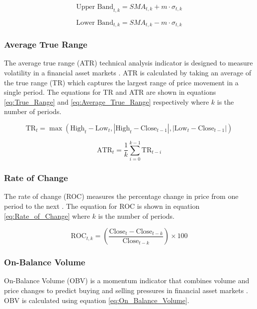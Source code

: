 \documentclass[journal]{new-aiaa}
\begin{document}
\begin{equation}\label{eq:Upper_Band}
        \text{Upper Band}_{t,k} = SMA_{t,k} + m \cdot \sigma_{t,k}
\end{equation}

\begin{equation}\label{eq:Lower_Band}
        \text{Lower Band}_{t,k} = SMA_{t,k} - m \cdot \sigma_{t,k}
\end{equation}

\subsubsection{Average True Range}\label{sec:Technical_Analysis:Average_True_Range}
The average true range (ATR) technical analysis indicator is designed to measure volatility in a financial asset markets \cite{wilder1978new}.
ATR is calculated by taking an average of the true range (TR) which captures the largest range of price movement in a single period.
The equations for TR and ATR are shown in equations \ref{eq:True_Range} and \ref{eq:Average_True_Range} respectively where $k$ is the number of periods.

\begin{equation}\label{eq:True_Range}
        \text{TR}_t = \max\left(\text{High}_t - \text{Low}_t, \left|\text{High}_t - \text{Close}_{t-1}\right|, \left|\text{Low}_t - \text{Close}_{t-1}\right|\right)
\end{equation}

\begin{equation}\label{eq:Average_True_Range}
        \text{ATR}_t = \frac{1}{k} \sum_{i=0}^{k-1} \text{TR}_{t-i}
\end{equation}

\subsubsection{Rate of Change}\label{sec:Technical_Analysis:Rate_of_Change}
The rate of change (ROC) measures the percentage change in price from one period to the next \cite{granville1963new}.
The equation for ROC is shown in equation \ref{eq:Rate_of_Change} where $k$ is the number of periods.

\begin{equation}\label{eq:Rate_of_Change}
        \text{ROC}_{t,k} = \left(\frac{\text{Close}_{t} - \text{Close}_{t-k}}{\text{Close}_{t-k}}\right) \times 100
\end{equation}

\subsubsection{On-Balance Volume}\label{sec:Technical_Analysis:On_Balance_Volume}
On-Balance Volume (OBV) is a momentum indicator that combines volume and price changes to predict buying and selling pressures in financial asset markets \cite{granville1963new}.
OBV is calculated using equation \ref{eq:On_Balance_Volume}.
\end{document}

